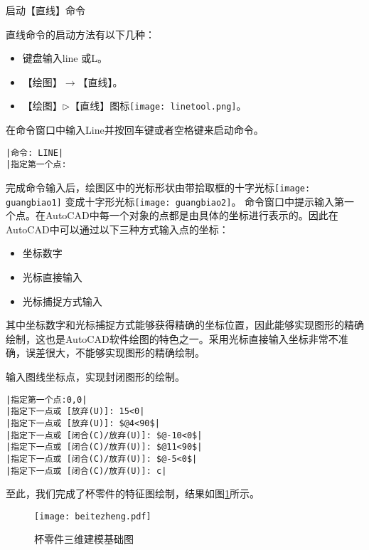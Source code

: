 \begin{procedure}
\item 启动【直线】命令

直线命令的启动方法有以下几种：
\begin{itemize}
\item 键盘输入line 或L。
\item 【绘图】$\rightarrow$【直线】。
\item 【绘图】$\triangleright$【直线】图标\texttt{[image: linetool.png]}。
\end{itemize}
在命令窗口中输入Line并按回车键或者空格键来启动命令。
\begin{lstlisting}
|命令: LINE|
|指定第一个点:
\end{lstlisting}
完成命令输入后，绘图区中的光标形状由带拾取框的十字光标\texttt{[image: guangbiao1]} 变成十字形光标\texttt{[image: guangbiao2]}。
命令窗口中提示输入第一个点。在AutoCAD中每一个对象的点都是由具体的坐标进行表示的。因此在AutoCAD中可以通过以下三种方式输入点的坐标：
\begin{itemize}
\item 坐标数字
\item 光标直接输入
\item 光标捕捉方式输入
\end{itemize}

其中坐标数字和光标捕捉方式能够获得精确的坐标位置，因此能够实现图形的精确绘制，这也是AutoCAD软件绘图的特色之一。采用光标直接输入坐标非常不准确，误差很大，不能够实现图形的精确绘制。
\item 输入图线坐标点，实现封闭图形的绘制。

\begin{lstlisting}
|指定第一个点:0,0|
|指定下一点或 [放弃(U)]: 15<0|
|指定下一点或 [放弃(U)]: $@4<90$|
|指定下一点或 [闭合(C)/放弃(U)]: $@-10<0$|
|指定下一点或 [闭合(C)/放弃(U)]: $@11<90$|
|指定下一点或 [闭合(C)/放弃(U)]: $@-5<0$|
|指定下一点或 [闭合(C)/放弃(U)]: c|
\end{lstlisting}

至此，我们完成了杯零件的特征图绘制，结果如图\ref{fig:bettezheng}所示。
\noindent
\begin{figure}[htbp]
\centering
\texttt{[image: beitezheng.pdf]}
\caption{杯零件三维建模基础图}\label{fig:bettezheng}
\end{figure}
\end{procedure}

